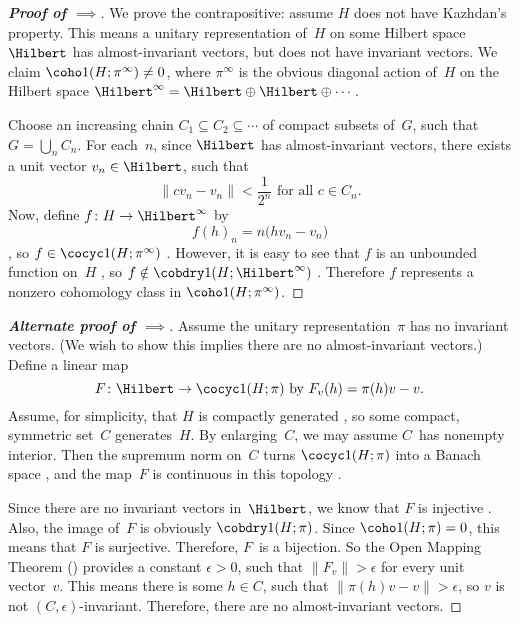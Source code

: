 \begin{proof}[\bf {} Proof of $\implies$]
We prove the contrapositive: assume $H$ does not have Kazhdan's property.
This means a unitary representation of~$H$ on some Hilbert space~$\Hilbert$ has almost-invariant vectors, but does not have invariant vectors. We claim $\coho1(H; \pi^\infty) \neq 0$, where $\pi^\infty$ is the obvious diagonal action of~$H$ on the Hilbert space $\Hilbert^\infty = \Hilbert \oplus \Hilbert \oplus \cdots$.

Choose an increasing chain $C_1 \subseteq C_2 \subseteq \cdots$ of compact subsets of~$G$, such that $G = \bigcup_n C_n$. For each~$n$, since $\Hilbert$ has almost-invariant vectors, there exists a unit vector $v_n \in \Hilbert$, such that
	$$ \text{$\displaystyle \| c v_n - v_n \| < \frac{1}{2^n}$ for all $c \in C_n$} . $$
Now, define $f \colon H \to \Hilbert^\infty$ by 
	$$ f(h)_n = n\bigl( hv_n - v_n \bigr) $$
, so $f \in \cocyc1(H; \pi^\infty)$ .
However, it is easy to see that $f$ is an unbounded function on~$H$ , so $f \notin \cobdry1(H; \Hilbert^\infty)$ . Therefore $f$ represents a nonzero cohomology class in $\coho1(H; \pi^\infty)$. 
\end{proof}

\begin{proof}[\bf {} Alternate proof of $\implies$]
Assume the unitary representation~$\pi$ has no invariant vectors. (We wish to show this implies there are no almost-invariant vectors.)
Define a linear map 
	$$ \text{$F \colon \Hilbert \to \cocyc1(H;\pi)$ by $ F_v(h) = \pi(h)v - v$} .$$
Assume, for simplicity, that $H$ is compactly generated , so some compact, symmetric set~$C$ generates~$H$. By enlarging~$C$, we may assume $C$~has nonempty interior. 
Then the supremum norm on~$C$ turns $\cocyc1(H;\pi)$ into a Banach space , and the map~$F$ is continuous in this topology . 

Since there are no invariant vectors in~$\Hilbert$, we know that $F$ is injective .
Also, the image of~$F$ is obviously $\cobdry1(H;\pi)$. Since $\coho1(H;\pi) = 0$, this means that $F$ is surjective. Therefore, $F$~is a bijection.
So the Open Mapping Theorem () provides a constant $\epsilon > 0$, such that $\|F_v\| > \epsilon$ for every unit vector~$v$. This means there is some $h \in C$, such that $\| \pi(h)v - v \| > \epsilon$, so $v$ is not $(C,\epsilon)$-invariant. Therefore, there are no almost-invariant vectors.
\end{proof}

